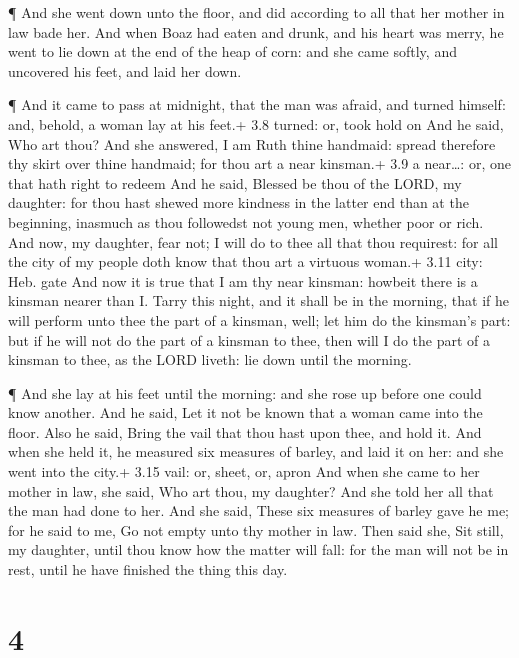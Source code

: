  ¶ And she went down unto the floor, and did according to
all that her mother in law bade her.  And when Boaz had
eaten and drunk, and his heart was merry, he went to lie down at the end
of the heap of corn: and she came softly, and uncovered his feet, and
laid her down.

 ¶ And it came to pass at midnight, that the man was afraid,
and turned himself: and, behold, a woman lay at his feet.+ 3.8 turned:
or, took hold on  And he said, Who art thou? And she
answered, I am Ruth thine handmaid: spread therefore thy skirt over
thine handmaid; for thou art a near kinsman.+ 3.9 a near\ldots: or, one
that hath right to redeem  And he said, Blessed be thou of
the LORD, my daughter: for thou hast shewed more kindness in the latter
end than at the beginning, inasmuch as thou followedst not young men,
whether poor or rich.  And now, my daughter, fear not; I
will do to thee all that thou requirest: for all the city of my people
doth know that thou art a virtuous woman.+ 3.11 city: Heb. gate
 And now it is true that I am thy near kinsman: howbeit
there is a kinsman nearer than I.  Tarry this night, and it
shall be in the morning, that if he will perform unto thee the part of a
kinsman, well; let him do the kinsman's part: but if he will not do the
part of a kinsman to thee, then will I do the part of a kinsman to thee,
as the LORD liveth: lie down until the morning.

 ¶ And she lay at his feet until the morning: and she rose
up before one could know another. And he said, Let it not be known that
a woman came into the floor.  Also he said, Bring the vail
that thou hast upon thee, and hold it. And when she held it, he measured
six measures of barley, and laid it on her: and she went into the city.+
3.15 vail: or, sheet, or, apron  And when she came to her
mother in law, she said, Who art thou, my daughter? And she told her all
that the man had done to her.  And she said, These six
measures of barley gave he me; for he said to me, Go not empty unto thy
mother in law.  Then said she, Sit still, my daughter,
until thou know how the matter will fall: for the man will not be in
rest, until he have finished the thing this day.

\hypertarget{section-3}{%
\section{4}\label{section-3}}

